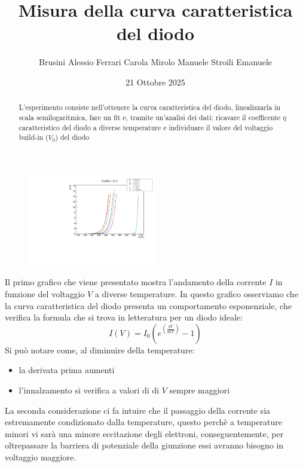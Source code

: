 \documentclass[10pt,twocolumn]{article}
\begin{document}
\justifying
	\title{\textbf{Misura della curva caratteristica del diodo}}
	\author{Brusini Alessio \hspace{0.7cm} Ferrari Carola \hspace{0.7cm} Mirolo Manuele \hspace{0.7cm} Stroili Emanuele}
	\date{21 Ottobre 2025}
	\maketitle
	\onecolumn
\vspace{3cm}
	\begin{abstract}
		\centering
		\large
    L'esperimento consiste nell'ottenere la curva caratteristica del diodo, linealizzarla in scala semilogaritmica, 
	fare un fit e, tramite un'analisi dei dati: ricavare il coefficente $\eta$ caratteristico del diodo a diverse temperature
	e individuare il valore del voltaggio build-in ($V_0$) del diodo

       
	\end{abstract}

	\newpage
\restoregeometry
\twocolumn

\begin{figure}[H] %
  \centering
  \includegraphics[width=0.5\textwidth]{I_vs_V.pdf} %
  \label{fig:II}
\end{figure}
Il primo grafico che viene presentato mostra l'andamento della corrente $I$ in funzione del voltaggio $V$ a diverse 
temperature. In questo grafico osserviamo che la curva caratteristica del diodo presenta un comportamento esponenziale, 
che verifica la formula che si trova in letteratura per un diodo ideale:
\[
\displaystyle I(V)= I_0 \left(e^{(\frac{qV}{\eta kT})} - 1\right)
\]
Si può notare come, al diminuire della temperature:

\begin{itemize}
  \item la derivata prima aumenti
  \item l'innalzamento si verifica a valori di di $V$ sempre maggiori
\end{itemize}
La seconda considerazione ci fa intuire che il passaggio della corrente sia estremamente condizionato dalla temperature, questo perchè 
a temperature minori vi sarà una minore eccitazione degli elettroni, conseguentemente, per oltrepassare la barriera di potenziale della giunzione
essi avranno bisogno in voltaggio maggiore.
\end{document}

